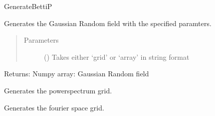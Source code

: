 \documentclass[letterpaper,10pt,english]{sphinxmanual}
\begin{document}
\begin{fulllineitems}
\begin{fulllineitems}
\begin{quote}
\begin{description}
\end{description}\end{quote}

\end{fulllineitems}


\begin{fulllineitems}
\label{\detokenize{gaussClass:gaussClass.GaussianRandomField.Gen_GRF}}
\sphinxAtStartPar
GenerateBettiP

\sphinxAtStartPar
Generates the Gaussian Random field with the specified paramters.
\begin{quote}\begin{description}
\item[{Parameters}] \leavevmode
\sphinxAtStartPar
{} () \textendash{} Takes either ‘grid’ or ‘array’ in string format

\end{description}\end{quote}

\sphinxAtStartPar
Returns:
Numpy array: Gaussian Random field

\end{fulllineitems}


\begin{fulllineitems}
\label{\detokenize{gaussClass:gaussClass.GaussianRandomField.PowerSpectrum_grid_generator}}
\sphinxAtStartPar
Generates the powerspectrum grid.

\end{fulllineitems}


\begin{fulllineitems}
\label{\detokenize{gaussClass:gaussClass.GaussianRandomField.fourier_space_ind}}
\sphinxAtStartPar
Generates the fourier space grid.


\end{fulllineitems}
\end{fulllineitems}
\end{document}
